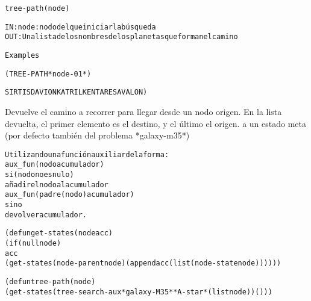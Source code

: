 \begin{aibox}{\function}
\begin{alltt}
tree-path (node)


   IN:node: nodo del que iniciar la búsqueda
   OUT: Una lista de los nombres de los planetas que forman el camino

\end{alltt}
\end{aibox}

\begin{aibox}{\examples}
\begin{alltt}
Examples 

(TREE-PATH *node-01*)

SIRTIS DAVION KATRIL KENTARES AVALON)


\end{alltt}
\end{aibox}

\begin{aibox}{\comments}
   Devuelve el camino a recorrer para llegar desde un nodo origen. En la lista devuelta, el primer elemento es el destino, y el último el origen.
   a un estado meta (por defecto también del problema *galaxy-m35*)


\end{aibox}

\begin{aibox}{\pseudocode}
\begin{alltt}
   Utilizando una función auxiliar de la forma:
   aux\_fun (nodo acumulador)
       si (nodo no es nulo)
           añadir el nodo al acumulador
           aux\_fun(padre(nodo) acumulador)
       sino
           devolver acumulador.

\end{alltt}
\end{aibox}

\begin{aibox}{\code}
\begin{alltt}
(defun get-states (node acc)
    (if (null node)
        acc
        (get-states (node-parent node) (append acc (list (node-state node))))))

(defun tree-path (node)
    (get-states (tree-search-aux *galaxy-M35* *A-star* (list node)) ()))





\end{alltt}
\end{aibox}
